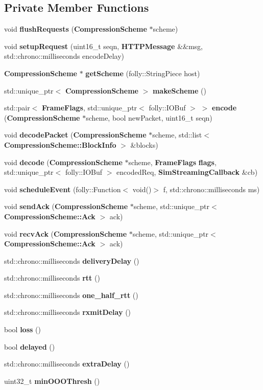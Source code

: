 \subsection*{Private Member Functions}
\begin{DoxyCompactItemize}
\item 
void {\bf flush\+Requests} ({\bf Compression\+Scheme} $\ast$scheme)
\item 
void {\bf setup\+Request} (uint16\+\_\+t seqn, {\bf H\+T\+T\+P\+Message} \&\&msg, std\+::chrono\+::milliseconds encode\+Delay)
\item 
{\bf Compression\+Scheme} $\ast$ {\bf get\+Scheme} (folly\+::\+String\+Piece host)
\item 
std\+::unique\+\_\+ptr$<$ {\bf Compression\+Scheme} $>$ {\bf make\+Scheme} ()
\item 
std\+::pair$<$ {\bf Frame\+Flags}, std\+::unique\+\_\+ptr$<$ folly\+::\+I\+O\+Buf $>$ $>$ {\bf encode} ({\bf Compression\+Scheme} $\ast$scheme, bool new\+Packet, uint16\+\_\+t seqn)
\item 
void {\bf decode\+Packet} ({\bf Compression\+Scheme} $\ast$scheme, std\+::list$<$ {\bf Compression\+Scheme\+::\+Block\+Info} $>$ \&blocks)
\item 
void {\bf decode} ({\bf Compression\+Scheme} $\ast$scheme, {\bf Frame\+Flags} {\bf flags}, std\+::unique\+\_\+ptr$<$ folly\+::\+I\+O\+Buf $>$ encoded\+Req, {\bf Sim\+Streaming\+Callback} \&cb)
\item 
void {\bf schedule\+Event} (folly\+::\+Function$<$ void()$>$ f, std\+::chrono\+::milliseconds ms)
\item 
void {\bf send\+Ack} ({\bf Compression\+Scheme} $\ast$scheme, std\+::unique\+\_\+ptr$<$ {\bf Compression\+Scheme\+::\+Ack} $>$ ack)
\item 
void {\bf recv\+Ack} ({\bf Compression\+Scheme} $\ast$scheme, std\+::unique\+\_\+ptr$<$ {\bf Compression\+Scheme\+::\+Ack} $>$ ack)
\item 
std\+::chrono\+::milliseconds {\bf delivery\+Delay} ()
\item 
std\+::chrono\+::milliseconds {\bf rtt} ()
\item 
std\+::chrono\+::milliseconds {\bf one\+\_\+half\+\_\+rtt} ()
\item 
std\+::chrono\+::milliseconds {\bf rxmit\+Delay} ()
\item 
bool {\bf loss} ()
\item 
bool {\bf delayed} ()
\item 
std\+::chrono\+::milliseconds {\bf extra\+Delay} ()
\item 
uint32\+\_\+t {\bf min\+O\+O\+O\+Thresh} ()
\end{DoxyCompactItemize}
